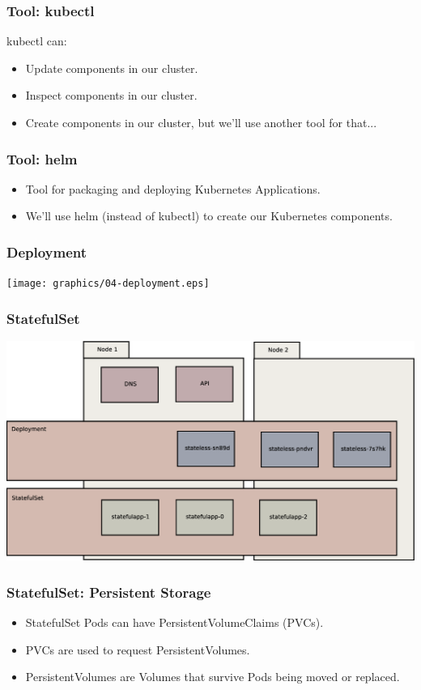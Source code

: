 \begin{frame}
\frametitle{Tool: kubectl\footnotemark}
kubectl can:
\begin{itemize}
\item Update components in our cluster.\pause
\item Inspect components in our cluster.\pause
\item Create components in our cluster, but we'll use another tool for that...
\end{itemize}
\end{frame}

\begin{frame}
\frametitle{Tool: helm\footnotemark}
\begin{itemize}
    \item Tool for packaging and deploying Kubernetes Applications.
    \item We'll use helm (instead of kubectl) to create our Kubernetes components.
\end{itemize}
\end{frame}

\begin{frame}
    \frametitle{Deployment}
    \texttt{[image: graphics/04-deployment.eps]}
\end{frame}

\begin{frame}
    \frametitle{StatefulSet}
    \includegraphics[width=\textwidth,height=0.85\textheight,keepaspectratio]{graphics/05-statefulSet.eps}
\end{frame}

\begin{frame}
    \frametitle{StatefulSet: Persistent Storage}
    \begin{itemize}
        \item StatefulSet Pods can have PersistentVolumeClaims (PVCs).\pause
        \item PVCs are used to request PersistentVolumes.\pause
        \item PersistentVolumes are Volumes that survive Pods being moved or replaced.
    \end{itemize}
\end{frame}


